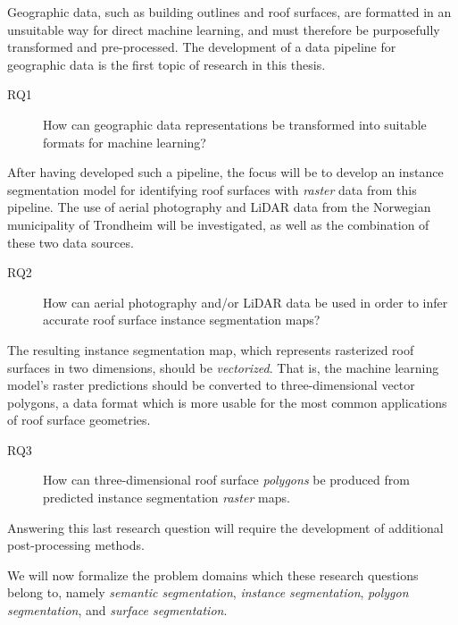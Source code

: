 Geographic data, such as building outlines and roof surfaces, are formatted in an unsuitable way for direct machine learning, and must therefore be purposefully transformed and pre-processed.
The development of a data pipeline for geographic data is the first topic of research in this thesis.
%
\begin{description}
  \item[RQ1] How can geographic data representations be transformed into suitable formats for machine learning?
\end{description}
%
After having developed such a pipeline, the focus will be to develop an instance segmentation model for identifying roof surfaces with \emph{raster} data from this pipeline.
The use of aerial photography and LiDAR data from the Norwegian municipality of Trondheim will be investigated, as well as the combination of these two data sources.
%
\begin{description}
  \item[RQ2] How can aerial photography and/or LiDAR data be used in order to infer accurate roof surface instance segmentation maps?
\end{description}
%
The resulting instance segmentation map, which represents rasterized roof surfaces in two dimensions, should be \emph{vectorized}.
That is, the machine learning model's raster predictions should be converted to three-dimensional vector polygons, a data format which is more usable for the most common applications of roof surface geometries.
%
\begin{description}
  \item[RQ3] How can three-dimensional roof surface \emph{polygons} be produced from predicted instance segmentation \emph{raster} maps.
\end{description}
%
Answering this last research question will require the development of additional post-processing methods.

We will now formalize the problem domains which these research questions belong to, namely \textit{semantic segmentation}, \textit{instance segmentation}, \textit{polygon segmentation}, and \textit{surface segmentation}.
